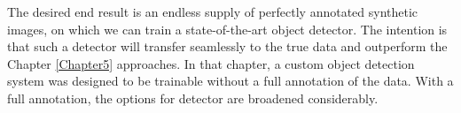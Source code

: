 The desired end result is an endless supply of perfectly annotated synthetic images, on which we can train a state-of-the-art object detector. The intention is that such a detector will transfer seamlessly to the true data and outperform the Chapter \ref{Chapter5} approaches. In that chapter, a custom object detection system was designed to be trainable without a full annotation of the data. With a full annotation, the options for detector are broadened considerably.

%
%
%
%
%
%
